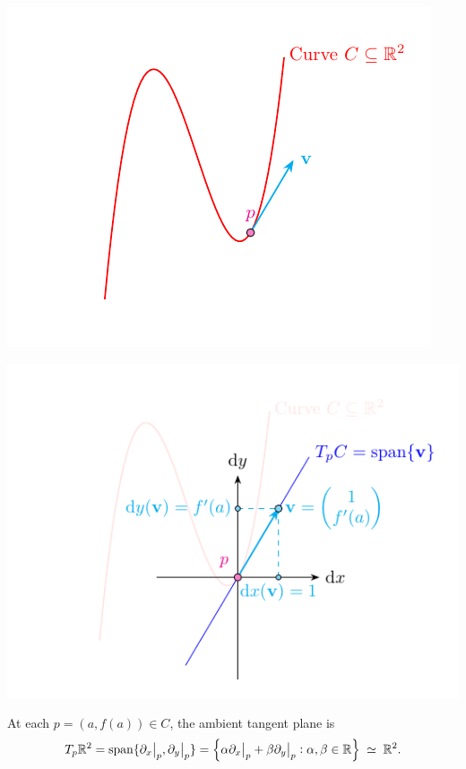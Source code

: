 \documentclass[11pt,openany]{article}
\renewcommand{\span}{\mathrm{span}}
\begin{document}
\begin{center}
\begin{minipage}{.49\textwidth}\centering
	\includegraphics[scale=1]{tangent-space-6-1.pdf}
\end{minipage}\hfill
\begin{minipage}{.49\textwidth}\centering
	\includegraphics[scale=1]{tangent-space-6-2.pdf}
\end{minipage}
\end{center}
At each \(p=(a,f(a))\in C\), the ambient tangent plane is \[
T_p\mathbb{R}^2
=\mathrm{span}\{\partial_x\big|_p,\partial_y\big|_p\}
=\set{\alpha\partial_x\big|_p+\beta\partial_y\big|_p:\alpha,\beta\in\mathbb{R}}\;\simeq\;\mathbb{R}^2.
\] 
\end{document}
